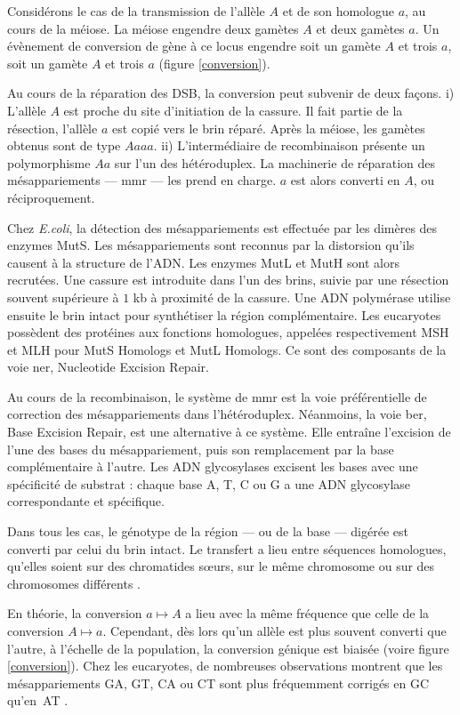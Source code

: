 \documentclass[11pt, oneside]{scrartcl}
\begin{document}
Considérons le cas de la transmission de l'allèle \(A\) et de son homologue \(a\),
au cours de la méiose. La méiose engendre deux gamètes \(A\) et deux gamètes \(a\).
Un évènement de conversion de gène à ce locus engendre soit un gamète \(A\) et
trois \(a\), soit un gamète \(A\) et trois \(a\) (figure \ref{conversion}). 

Au cours de la réparation des DSB, la conversion peut subvenir de deux façons.
i) L'allèle \(A\) est proche du site d'initiation de la cassure. Il fait partie de
la résection, l'allèle \(a\) est copié vers le brin réparé. Après la méiose, les
gamètes obtenus sont de type \(Aaaa\). ii) L'intermédiaire de recombinaison
présente un polymorphisme \(Aa\) sur l'un des hétéroduplex. La machinerie de
réparation des mésappariements --- \ac{mmr} --- les prend en charge. \(a\) est
alors converti en \(A\), ou réciproquement.

Chez \emph{E.coli}, la détection des mésappariements est effectuée par les dimères
des enzymes MutS. Les mésappariements sont reconnus par la distorsion qu'ils
causent à la structure de l'ADN. Les enzymes MutL et MutH sont alors recrutées.
Une cassure est introduite dans l'un des brins, suivie par une résection souvent
supérieure à \(1\) kb à proximité de la cassure. Une ADN polymérase utilise
ensuite le brin intact pour synthétiser la région complémentaire. Les eucaryotes
possèdent des protéines aux fonctions homologues, appelées respectivement MSH et
MLH pour MutS Homologs et MutL Homologs. Ce sont des composants de la voie
\ac{ner}, Nucleotide Excision Repair.

Au cours de la recombinaison, le système de \ac{mmr} est la voie préférentielle
de correction des mésappariements dans l'hétéroduplex. Néanmoins, la voie
\ac{ber}, Base Excision Repair, est une alternative à ce système. Elle entraîne
l'excision de l'une des bases du mésappariement, puis son remplacement par la
base complémentaire à l'autre. Les ADN glycosylases excisent les bases avec une
spécificité de substrat : chaque base A, T, C ou G a une ADN glycosylase
correspondante et spécifique.

Dans tous les cas, le génotype de la région --- ou de la base --- digérée est
converti par celui du brin intact. Le transfert a lieu entre séquences
homologues, qu'elles soient sur des chromatides sœurs, sur le même chromosome ou
sur des chromosomes différents \cite{chen_gene_2007}.

\begin{transition}
  En théorie, la conversion $a \mapsto A$ a lieu avec la même fréquence que
  celle de la conversion $A \mapsto a$. Cependant, dès lors qu'un allèle est
  plus souvent converti que l'autre, à l'échelle de la population, la conversion
  génique est biaisée (voire figure \ref{conversion}). Chez les eucaryotes, de
  nombreuses observations montrent que les mésappariements GA, GT, CA ou CT sont
  plus fréquemment corrigés en GC qu'en AT \cite{duret_biased_2009}.
\end{transition}
\end{document}
